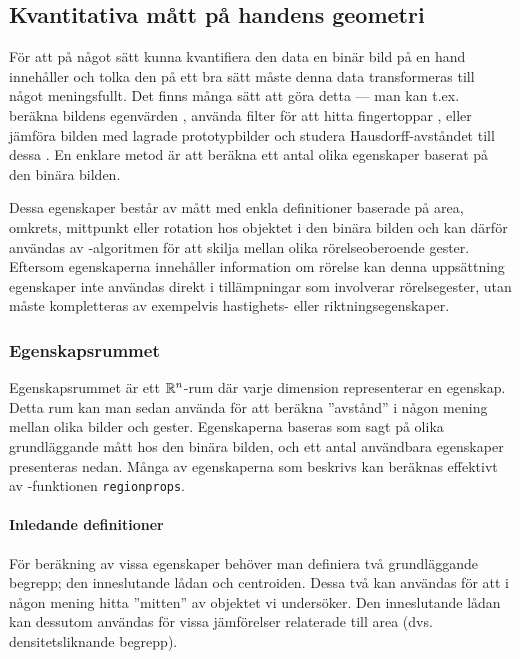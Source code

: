 \documentclass[../rapport_MVEX01-11-05]{subfiles}
\begin{document}
\subsection{Kvantitativa mått på handens geometri}\label{sec:features}

För att på något sätt kunna kvantifiera den data en binär bild på en hand 
innehåller och tolka den på ett bra sätt måste denna data transformeras till
något meningsfullt. Det finns många sätt att göra detta --- man kan t.ex.~
beräkna bildens egenvärden \cite{Funck02}, använda filter för att hitta
fingertoppar \cite{Noelker97}, eller jämföra bilden med lagrade prototypbilder
och studera Hausdorff-avståndet till dessa \cite{Nielsen04}. En enklare metod
är att beräkna ett antal olika egenskaper baserat på den binära bilden.

Dessa egenskaper består av mått med enkla definitioner baserade på area,
omkrets, mittpunkt eller rotation hos objektet i den binära bilden och kan
därför användas av \knn-algoritmen för att skilja mellan olika rörelseoberoende
gester. Eftersom egenskaperna innehåller information om rörelse kan denna
uppsättning egenskaper inte användas direkt i tillämpningar som involverar
rörelsegester, utan måste kompletteras av exempelvis hastighets- eller
riktningsegenskaper.

\subsubsection{Egenskapsrummet}

Egenskapsrummet är ett $\mathbb{R}^n$-rum där varje dimension representerar en
egenskap. Detta rum kan man sedan använda för att beräkna ''avstånd'' i
någon mening mellan olika bilder och gester. Egenskaperna baseras som sagt
på olika grundläggande mått hos den binära bilden, och ett antal användbara
egenskaper presenteras nedan.
Många av egenskaperna som beskrivs kan beräknas effektivt av
\MATLAB-funktionen \texttt{regionprops}.

\paragraph{Inledande definitioner}

För beräkning av vissa egenskaper behöver man definiera två
grundläggande begrepp; den inneslutande lådan och centroiden. Dessa
två kan användas för att i någon mening hitta ''mitten'' av objektet
vi undersöker. Den inneslutande lådan kan dessutom användas för vissa
jämförelser relaterade till area (dvs. densitetsliknande begrepp).
\end{document}
